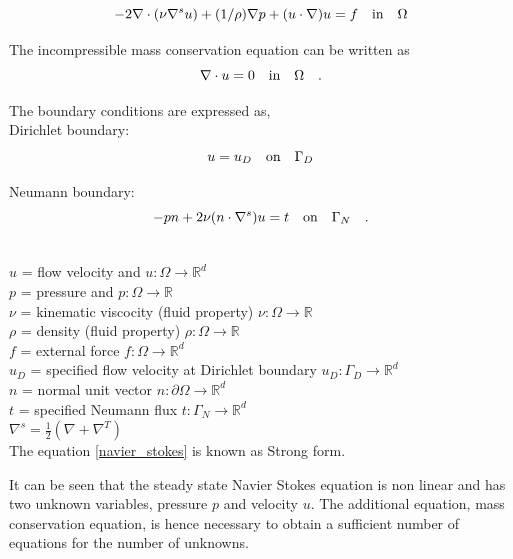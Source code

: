 \documentclass[a4paper,12pt]{book}
\begin{document}
\begin{equation} \label{navier_stokes}
-2\nabla \cdot (\nu \nabla^s u) + (1/\rho) \nabla p + (u \cdot \nabla)u = f \quad   \textnormal{in}  \quad \Omega
\end{equation} 

The incompressible mass conservation equation can be written as
\begin{equation}\label{mass_conservation}
\nabla \cdot u=0 \quad   \textnormal{in}  \quad \Omega \quad \textrm{.}
\end{equation}

The boundary conditions are expressed as,\\

Dirichlet boundary:
\begin{equation}\label{dirichlet_ns}
u=u_D \quad \textnormal{on} \quad \Gamma_D
\end{equation}

Neumann boundary:
\begin{equation} \label{neumann_ns}
-pn + 2\nu(n \cdot \nabla^s)u = t \quad   \textnormal{on}  \quad \Gamma_N \quad \textrm{.}
\end{equation}

$ $\\
$u$ = flow velocity and $u:\Omega \rightarrow \mathbb{R}^d$ \\
$p$ = pressure and $p:\Omega \rightarrow \mathbb{R}$\\
$\nu$ = kinematic viscocity (fluid property) $\nu:\Omega \rightarrow \mathbb{R}$\\ 
$\rho$ = density (fluid property) $\rho:\Omega \rightarrow \mathbb{R}$\\
$f$ = external force $f:\Omega \rightarrow \mathbb{R}^d$\\
$u_D$ = specified flow velocity at Dirichlet boundary $u_D:\Gamma_D \rightarrow \mathbb{R}^d$\\
$n$ = normal unit vector $n:\partial \Omega \rightarrow \mathbb{R}^d$\\
$t$ = specified Neumann flux $t:\Gamma_N \rightarrow \mathbb{R}^d$\\
$\nabla^s = \frac{1}{2}(\nabla + \nabla^T)$\\


The equation \eqref{navier_stokes} is known as Strong form.

It can be seen that the steady state Navier Stokes equation is non linear and has two unknown variables, pressure $p$ and velocity $u$. The additional equation, mass conservation equation, is hence necessary to obtain a sufficient number of equations for the number of unknowns.
\end{document}
